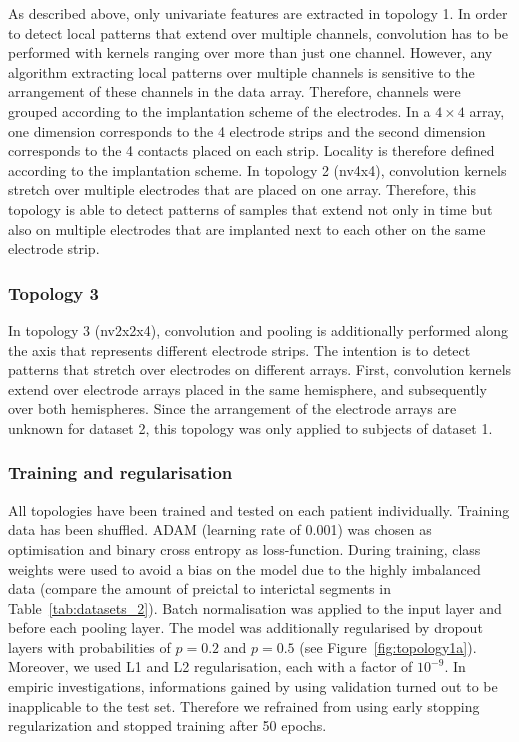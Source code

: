 \documentclass[a4paper, conference]{IEEEtran}
\begin{document}
As described above, only univariate features are extracted in topology 1. In order to detect local patterns that extend over multiple channels, convolution has to be performed with kernels ranging over more than just one channel. However, any algorithm extracting local patterns over multiple channels is sensitive to the arrangement of these channels in the data array. Therefore, channels were grouped according to the implantation scheme of the electrodes. In a $4\times4$ array, one dimension corresponds to the 4 electrode strips and the second dimension corresponds to the 4 contacts placed on each strip. Locality is therefore defined according to the implantation scheme. In topology 2 (nv4x4), convolution kernels stretch over multiple electrodes that are placed on one array. Therefore, this topology is able to detect patterns of samples that extend not only in time but also on multiple electrodes that are implanted next to each other on the same electrode strip. 

\subsubsection*{Topology 3}
In topology 3 (nv2x2x4), convolution and pooling is additionally performed along the axis that represents different electrode strips. The intention is to detect patterns that stretch over electrodes on different arrays. First, convolution kernels extend over electrode arrays placed in the same hemisphere, and subsequently over both hemispheres. Since the arrangement of the electrode arrays are unknown for dataset 2, this topology was only applied to subjects of dataset 1.

\subsubsection*{Training and regularisation}
All topologies have been trained and tested on each patient individually. Training data has been shuffled. ADAM \cite{Kingma2014} (learning rate of 0.001) was chosen as optimisation and binary cross entropy as loss-function. During training, class weights were used to avoid a bias on the model due to the highly imbalanced data (compare the amount of preictal to interictal segments in Table~\ref{tab:datasets_2}).
Batch normalisation \cite{Ioffe2015} was applied to the input layer and before each pooling layer. The model was additionally regularised by dropout layers with probabilities of $p=0.2$ and $p=0.5$ (see Figure~\ref{fig:topology1a}). Moreover, we used L1 and L2 regularisation, each with a factor of $10^{-9}$. In empiric investigations, informations gained by using validation turned out to be inapplicable to the test set. Therefore we refrained from using early stopping regularization and stopped training after 50 epochs.
\end{document}
